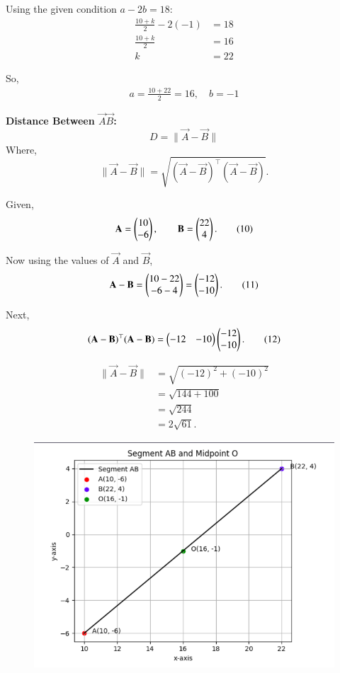 \documentclass[journal]{IEEEtran}
\begin{document}
Using the given condition $a - 2b = 18$:
\begin{align}
\frac{10+k}{2} - 2(-1) &= 18 \tag{4}\\
\frac{10+k}{2} &= 16 \tag{5}\\
k &= 22 \tag{6}
\end{align}

So,
\begin{align}
a = \frac{10+22}{2} = \boxed{16}, \quad b = \boxed{-1} \tag{7}
\end{align}

\textbf{Distance Between \(\vec{A}\vec{B}\):}
\[
D=\|\vec{A}-\vec{B}\| \tag{8}
\]
Where,
\[
\|\vec{A}-\vec{B}\|=\sqrt{(\vec{A}-\vec{B})^{\top}(\vec{A}-\vec{B})}. \tag{9}
\]

Given,
\[
\mathbf{A}=\begin{pmatrix}10\\-6\end{pmatrix},\qquad \mathbf{B}=\begin{pmatrix}22\\4\end{pmatrix}. \tag{10}
\]

Now using the values of \(\vec{A}\) and \(\vec{B}\),
\[
\mathbf{A}-\mathbf{B}=\begin{pmatrix}10-22\\-6-4\end{pmatrix}=\begin{pmatrix}-12\\-10\end{pmatrix}. \tag{11}
\]

Next,
\[
(\mathbf{A}-\mathbf{B})^{\top}(\mathbf{A}-\mathbf{B})=\begin{pmatrix}-12&-10\end{pmatrix}\begin{pmatrix}-12\\-10\end{pmatrix}. \tag{12}
\]

\begin{align}
\|\vec{A}-\vec{B}\|&=\sqrt{(-12)^2+(-10)^2} \tag{13}\\
      &=\sqrt{144+100} \tag{14}\\
      &=\sqrt{244} \tag{15}\\
      &=\boxed{2\sqrt{61}}. \tag{16}
\end{align}

\begin{figure}[H]
    \centering
    \includegraphics[width=\columnwidth]{figs/mg2.png}
\end{figure}
\end{document}
